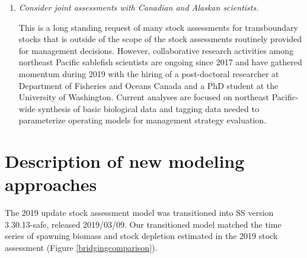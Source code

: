 \documentclass[11pt,
  english,
  a4paper,
]{article}
\begin{document}
\begin{enumerate}
\item \emph{Consider joint assessments with Canadian and Alaskan scientists.}

This is a long standing request of many stock assessments for transboundary stocks that is outside of the scope of the stock assessments routinely provided for management decisions. However, collaborative research activities among northeast Pacific sablefish scientists are ongoing since 2017 and have gathered momentum during 2019 with the hiring of a post-doctoral researcher at Department of Fisheries and Oceans Canada and a PhD student at the University of Washington. Current analyses are focused on northeast Pacific-wide synthesis of basic biological data and tagging data needed to parameterize operating models for management strategy evaluation.

\end{enumerate}


\hypertarget{description-of-new-modeling-approaches}{%
\section{Description of new modeling approaches}\label{description-of-new-modeling-approaches}}

\leavevmode\tagmcend\tagstructend

The 2019 update stock assessment model was transitioned into SS version 3.30.13-safe, released 2019/03/09. Our transitioned model matched the time series of spawning biomass and stock depletion estimated in the 2019 stock assessment (Figure \ref{bridgingcomparison}).
\end{document}
